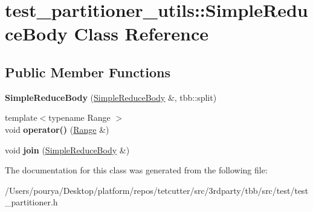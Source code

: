 \hypertarget{classtest__partitioner__utils_1_1SimpleReduceBody}{}\section{test\+\_\+partitioner\+\_\+utils\+:\+:Simple\+Reduce\+Body Class Reference}
\label{classtest__partitioner__utils_1_1SimpleReduceBody}
\subsection*{Public Member Functions}
\begin{DoxyCompactItemize}
\item 
\hypertarget{classtest__partitioner__utils_1_1SimpleReduceBody_a572eb55b3f7ec494a891a09409c1b96c}{}{\bfseries Simple\+Reduce\+Body} (\hyperlink{classtest__partitioner__utils_1_1SimpleReduceBody}{Simple\+Reduce\+Body} \&, tbb\+::split)\label{classtest__partitioner__utils_1_1SimpleReduceBody_a572eb55b3f7ec494a891a09409c1b96c}

\item 
\hypertarget{classtest__partitioner__utils_1_1SimpleReduceBody_aa5b9e7d900bf29a6b52b2ffef188e962}{}{\footnotesize template$<$typename Range $>$ }\\void {\bfseries operator()} (\hyperlink{classtbb_1_1blocked__range}{Range} \&)\label{classtest__partitioner__utils_1_1SimpleReduceBody_aa5b9e7d900bf29a6b52b2ffef188e962}

\item 
\hypertarget{classtest__partitioner__utils_1_1SimpleReduceBody_aaee606bdf3ffa0bbca31902b617104d9}{}void {\bfseries join} (\hyperlink{classtest__partitioner__utils_1_1SimpleReduceBody}{Simple\+Reduce\+Body} \&)\label{classtest__partitioner__utils_1_1SimpleReduceBody_aaee606bdf3ffa0bbca31902b617104d9}

\end{DoxyCompactItemize}


The documentation for this class was generated from the following file\+:\begin{DoxyCompactItemize}
\item 
/\+Users/pourya/\+Desktop/platform/repos/tetcutter/src/3rdparty/tbb/src/test/test\+\_\+partitioner.\+h\end{DoxyCompactItemize}
